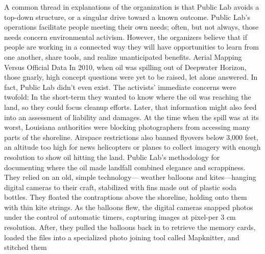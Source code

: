 A common thread in explanations of the organization is that Public Lab
avoids a top-down structure, or a singular drive toward a known outcome.
Public Lab's operations facilitate people meeting their own needs; often,
but not always, those needs concern environmental activism. However,
the organizers believe that if people are working in a connected way they
will have opportunities to learn from one another, share tools, and realize
unanticipated benefits.
Aerial Mapping Versus Official Data
In 2010, when oil was spilling out of Deepwater Horizon, those gnarly, high
concept questions were yet to be raised, let alone answered. In fact, Public
Lab didn't even exist. The activists' immediate concerns were twofold: In
the short-term they wanted to know where the oil was reaching the land,
so they could focus cleanup efforts. Later, that information might also feed
into an assessment of liability and damages.
At the time when the spill was at its worst, Louisiana authorities were
blocking photographers from accessing many parts of the shoreline. Airspace
restrictions also banned flyovers below 3,000 feet, an altitude too high
for news helicopters or planes to collect imagery with enough resolution to
show oil hitting the land.
Public Lab's methodology for documenting where the oil made landfall
combined elegance and scrappiness. They relied on an old, simple technology—
weather balloons and kites—hanging digital cameras to their craft,
stabilized with fins made out of plastic soda bottles. They floated the contraptions
above the shoreline, holding onto them with thin kite strings. As
the balloons flew, the digital cameras snapped photos under the control of
automatic timers, capturing images at pixel-per 3 cm resolution. After, they
pulled the balloons back in to retrieve the memory cards, loaded the files
into a specialized photo joining tool called Mapknitter, and stitched them

